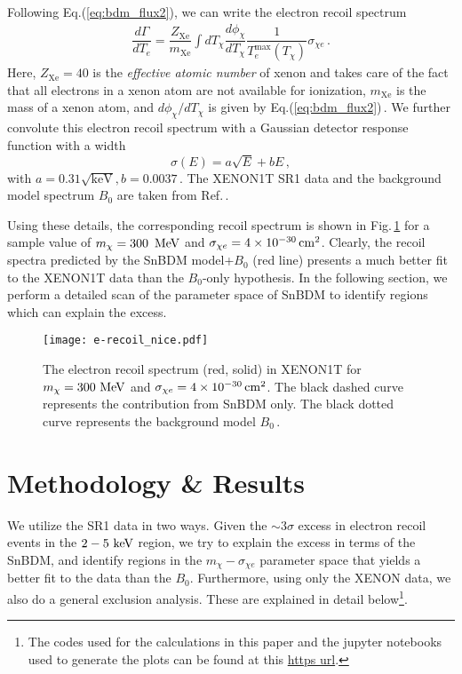 \documentclass[prd,aps,twocolumn,tightenlines,notitlepage,nofootinbib,preprintnumbers,letterpaper,superscriptaddress]{revtex4-2}
\newcommand{\sbdm}{SnBDM }
\newcommand{\cmsq}{{\rm\,cm^2}}
\newcommand{\keV}{{\rm\ keV}}
\newcommand{\MeV}{{\rm\ MeV}}
\newcommand{\phichi}{\phi_\chi}
\newcommand{\mchi}{m_\chi}
\newcommand{\sce}{\sigma_{\chi e}}
\begin{document}
Following Eq.(\ref{eq:bdm_flux2}), we can write the electron recoil spectrum
\begin{align}\label{eq:e_recoil}
    \dfrac{d\Gamma}{dT_e} = \dfrac{Z_\mathrm{Xe}}{m_\mathrm{Xe}} \int dT_\chi \dfrac{d\phichi}{dT_\chi} \dfrac{1}{T^\mathrm{max}_e(T_\chi)}\sce\,.
\end{align}
Here, $Z_\mathrm{Xe}=40$ is the \emph{effective atomic number} of xenon and takes care of the fact that all electrons in a xenon atom are not available for ionization, $m_\mathrm{Xe}$ is the mass of a xenon atom, and $d\phichi/dT_\chi$ is given by Eq.(\ref{eq:bdm_flux2})\,\cite{Aprile_2020}. We further convolute this electron recoil spectrum with a Gaussian detector response function with a width
\begin{equation}
    \sigma(E) = a\sqrt{E} + bE\,,
\end{equation}
with $a=0.31\sqrt{\text{keV}}, b=0.0037$\,\cite{Aprile_2020}. The XENON1T SR1 data and the background model spectrum $B_0$ are taken from Ref.\,\cite{Aprile_2020}.

Using these details, the corresponding recoil spectrum is shown in Fig.\,\ref{fig:recoil} for a sample value of $\mchi=300\,\MeV$ and $\sce=4\times 10^{-30}\cmsq$. Clearly, the recoil spectra predicted by the \sbdm model+$B_0$ (red line) presents a much better fit to the XENON1T data than the $B_0$-only hypothesis. In the following section, we perform a detailed scan of the parameter space of \sbdm to identify regions which can explain the excess.

\begin{figure}[!t]
    \centering
    \texttt{[image: e-recoil\_nice.pdf]}
    \caption{The electron recoil spectrum (red, solid) in XENON1T for $\mchi=300\MeV$ and $\sce=4\times 10^{-30}\cmsq$. The black dashed curve represents the contribution from \sbdm only. The black dotted curve represents the background model $B_0$\,\cite{Aprile_2020}.}
    \label{fig:recoil}
\end{figure}
\section{Methodology \& Results}
We utilize the SR1 data in two ways. Given the $\sim 3\sigma$ excess in electron recoil events in the $2-5\keV$ region, we try to explain the excess in terms of the SnBDM, and identify regions in the $\mchi-\sce$ parameter space that yields a better fit to the data than the $B_0$. Furthermore, using only the XENON data, we also do a general exclusion analysis. These are explained in detail below\footnote{The codes used for the calculations in this paper and the jupyter notebooks used to generate the plots can be found at this \href{https://github.com/anirbandas89/SnBDM}{https url}.}. 
\end{document}
